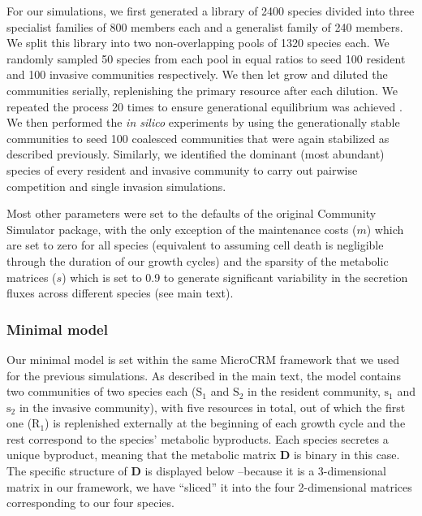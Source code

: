 \documentclass[a4paper,10pt]{article}
\begin{document}
For our simulations,
we first generated a library of 2400 species divided into three specialist
families of 800 members each
and a generalist family of 240 members.
We split this library into two non-overlapping pools of 1320 species each.
We randomly sampled 50 species from each pool in equal ratios to seed
100 resident and
100 invasive communities respectively.
We then let grow and diluted the communities serially,
replenishing the primary
resource after each dilution.
We repeated the process 20 times to ensure generational equilibrium was
achieved \cite{Goldford2018}.
We then performed the \textit{in silico} experiments by using the
generationally stable communities to seed 100 coalesced communities
that were again stabilized as described previously.
Similarly, we identified the dominant (most
abundant) species of every resident and invasive community to carry out pairwise
competition and single invasion simulations.

Most other parameters were set to the defaults of the original Community Simulator
package, with the only exception of the maintenance costs ($m$) which are set to
zero for all species
(equivalent to assuming cell death is negligible through the duration of our growth cycles)
and the sparsity of the metabolic matrices ($s$) which is set to 0.9
to generate significant variability in the secretion fluxes across different species
(see main text).

\subsubsection*{Minimal model}\label{methods:sim-min}

Our minimal model is set within the same MicroCRM framework that we used
for the previous simulations.
As described in the main text, the model contains two communities
of two species each
($\mathrm{S}_1$ and $\mathrm{S}_2$ in the resident community,
$\mathrm{s}_1$ and $\mathrm{s}_2$ in the invasive community),
with five resources in total, out of which the first one ($\mathrm{R}_1$)
is replenished externally at the beginning of each growth cycle
and the rest correspond to the species' metabolic byproducts.
Each species secretes a unique byproduct, meaning that the metabolic
matrix $\mathbf{D}$ is binary in this case.
The specific structure of $\mathbf{D}$ is displayed below
--because it is a 3-dimensional matrix in our framework,
we have ``sliced'' it into the four 2-dimensional matrices corresponding to
our four species.
\end{document}
